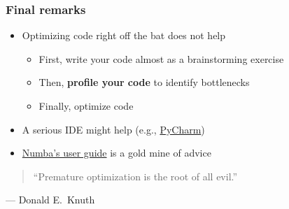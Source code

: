 \documentclass[10pt, aspectratio=1610]{beamer}
\begin{document}
\begin{frame}
  \frametitle{Final remarks}

  \begin{itemize}
    \item Optimizing code right off the bat does not help
      \begin{itemize}
        \item First, write your code almost as a brainstorming exercise
        \item Then, \textbf{profile your code} to identify bottlenecks
        \item Finally, optimize code
      \end{itemize}
    \item A serious IDE might help (e.g., \href{https://www.jetbrains.com/pycharm/}{PyCharm})
    \item \href{https://numba.pydata.org/numba-doc/dev/user/index.html}{Numba's user guide} is a gold mine of advice
  \end{itemize}

  \vfill

  \begin{flushright}
    \begin{quotation}
      \hfill``Premature optimization is the root of all evil.''
    \end{quotation}
    --- Donald E.~Knuth
  \end{flushright}

\end{frame}



%   
%   

\end{document}
